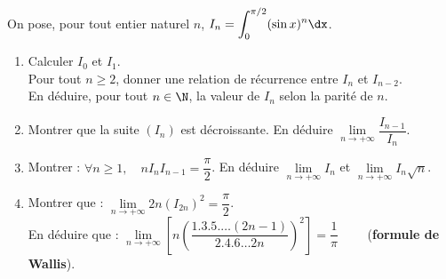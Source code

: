  On pose, pour tout entier naturel $n$, $I_n=\displaystyle\int_0^{\pi /2}(\sin
x)^n\dx$.
\begin{enumerate}
\item Calculer $I_0$ et $I_1$.\\
Pour tout $n\geq2$, donner une relation de récurrence entre $I_n$
et $I_{n-2}$.\\
En déduire, pour tout $n\in\N$, la valeur de $I_n$ selon la parité de $n$.
\item Montrer que la suite $(I_n)$ est décroissante. En déduire
$\lim\limits_{n\to+\infty }\dfrac{I_{n-1}}{I_n}$.
\item Montrer : $\forall n\geqslant 1,\quad nI_nI_{n-1}=\dfrac{\pi }{2}$. En
déduire $\lim\limits_{n\to+\infty }I_n$ et $\lim\limits_{n\to+\infty }I_n\sqrt{n}$.
\item Montrer que : $\lim\limits_{n\to+\infty }2n(I_{2n})^2=\dfrac{\pi }{2}$.\\ En
déduire que : $\lim\limits_{n\to+\infty
}\left[n\left(\dfrac{1.3.5.\dots(2n-1)}{2.4.6\dots
2n}\right)^2\right]=\dfrac{1}{\pi }\qquad$ (\textbf{formule de Wallis}).
\end{enumerate}



